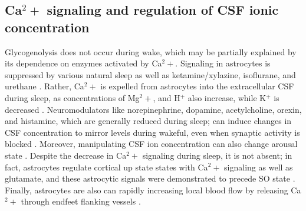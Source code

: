 \subsection*{Ca$^2+$ signaling and regulation of CSF ionic concentration}
Glycogenolysis does not occur during wake, which may be partially explained by its dependence on enzymes activated by Ca$^2+$\citep{Kjaerby2017}. Signaling in astrocytes is suppressed by various natural sleep as well as ketamine/xylazine, isoflurane, and urethane \citep{Thrane2012}. Rather, Ca$^2+$ is expelled from astrocytes into the extracellular CSF during sleep, as concentrations of Mg$^2+$, and H$^+$ also increase, while K$^+$ is decreased \citep{Ding2016}. Neuromodulators like norepinephrine, dopamine, acetylcholine, orexin, and histamine, which are generally reduced during sleep; can induce changes in CSF concentration to mirror levels during wakeful, even when synaptic activity is blocked \citep{Xie,DiNuzzo2017,Ding2016}. Moreover, manipulating CSF ion concentration can also change arousal state \citep{Ding2016}. Despite the decrease in Ca$^2+$ signaling during sleep, it is not absent; in fact, astrocytes regulate cortical up state states with Ca$^2+$ signaling as well as glutamate, and these astrocytic signals were demonstrated to precede SO state \citep{Poskanzer2011,Poskanzer2016}. Finally, astrocytes are also can rapidly increasing local blood flow by releasing Ca$^2+$ through endfeet flanking vessels \citep{Takano2006,Filosa2016}. 

